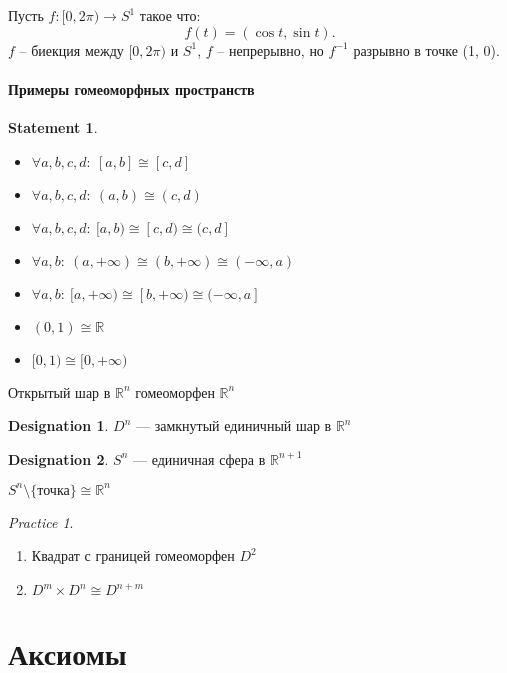 \documentclass[11pt]{book}
\newcommand{\R}{\mathbb{R}}
\theoremstyle{definition}
\theoremstyle{plain}
\theoremstyle{plain}
\newtheorem*{st}{Statement}
\theoremstyle{definition}
\newtheorem*{name}{Designation}
\theoremstyle{remark}
\newtheorem*{prac}{Practice}
\begin{document}
Пусть $ f: [0, 2\pi) \to  S^{1}$ такое что:
\[
    f(t) = (\cos t , \sin t)
.\]
$ f$ -- биекция между $ [0, 2\pi)$ и $ S^{1}$, $ f$ -- непрерывно, но $ f^{-1} $ разрывно в точке (1, 0).
\paragraph{Примеры гомеоморфных пространств}
\begin{st}
    $ $
    \begin{itemize}
	\item $ \forall a , b, c, d: ~ [a, b] \cong [c, d]$
	\item $ \forall a, b, c, d:~ (a, b) \cong (c, d)$
	\item $ \forall a, b, c, d:~ [a, b) \cong [c, d) \cong (c, d]$
	\item $ \forall a, b: ~ (a, +\infty) \cong (b, +\infty) \cong (-\infty, a)$
	\item $ \forall a, b: ~ [a, +\infty) \cong [b, +\infty) \cong (-\infty, a]$
	\item $ (0, 1) \cong \R$
	\item $ [0, 1) \cong [0, +\infty)$
    \end{itemize}
\end{st}
\begin{thm}
    Открытый шар в $ \R^{n}$ гомеоморфен  $ \R^{n}$
\end{thm}
\begin{name}
    $ D^{n} $ --- замкнутый единичный шар в  $ \R^{n}$
\end{name}
\begin{name}
    $ S^{n} $ --- единичная сфера в $ \R^{n+1}$
\end{name}
\begin{thm}
    $ S^{n} \setminus \{\text{точка}\} \cong \R^{n}$
\end{thm}
\begin{prac}
    $ $
    \begin{enumerate}
	\item Квадрат с границей гомеоморфен $ D^2$
	\item $ D^{m} \times D^{n} \cong D ^{n+m}$
    \end{enumerate}
\end{prac}
\section{Аксиомы}
\end{document}
